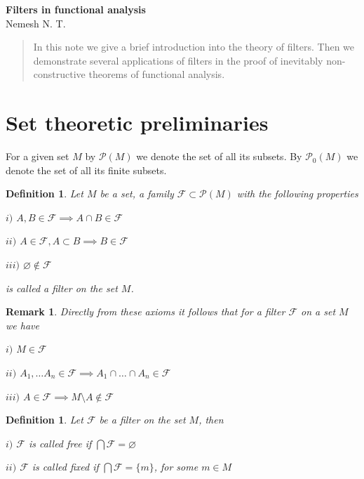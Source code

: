 \documentclass[12pt]{article}
\newtheorem{remark}[theorem]{Remark}
\newtheorem{definition}[theorem]{Definition}
\begin{document}
\begin{center}

\Large \textbf{Filters in functional analysis}\\[0.5cm]
\small {Nemesh N. T.}\\[0.5cm]

\end{center}

\begin{abstract}
In this note we give a brief introduction into the theory of filters. Then we demonstrate several applications of filters in the proof of inevitably non-constructive theorems of functional analysis.
\end{abstract}

\section{Set theoretic preliminaries}

For a given set $M$ by $\mathcal{P}(M)$ we denote the set of all its subsets. By $\mathcal{P}_0(M)$ we denote the set of all its finite subsets.

\begin{definition}\label{DefFilter} Let $M$ be a set, a family $\mathcal{F}\subset\mathcal{P}(M)$ with the following properties

$i)$ $A,B\in\mathcal{F}\implies A\cap B\in\mathcal{F}$

$ii)$ $A\in\mathcal{F}, A\subset B\implies B\in\mathcal{F}$

$iii)$ $\varnothing\notin\mathcal{F}$

is called a filter on the set $M$.
\end{definition}

\begin{remark}\label{RemAnyFilterContainsItsSet} Directly from these axioms it follows that for a filter $\mathcal{F}$ on a set $M$ we have

$i)$ $M\in\mathcal{F}$

$ii)$ $A_1,\ldots A_n\in\mathcal{F}\implies A_1\cap\ldots\cap A_n\in\mathcal{F}$

$iii)$ $A\in\mathcal{F}\implies M\setminus A\notin\mathcal{F}$

\end{remark}

\begin{definition}\label{DefFilterTypes} Let $\mathcal{F}$ be a filter on the set $M$, then 

$i)$ $\mathcal{F}$ is called free if $\bigcap\mathcal{F}=\varnothing$

$ii)$ $\mathcal{F}$ is called fixed if $\bigcap\mathcal{F}=\{m\}$, for some $m\in M$
\end{definition}
\end{document}

